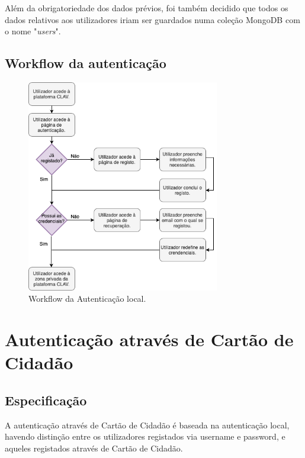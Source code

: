 Além da obrigatoriedade dos dados prévios, foi também decidido que todos os dados relativos aos utilizadores iriam ser guardados numa coleção MongoDB com o nome "\emph{users}".

\subsection{Workflow da autenticação}

\begin{figure}[h]
    \centering
    \includegraphics[width=0.75\textwidth]{img/diagramas/authlocal/AuthLocal.png}
    \caption{Workflow da Autenticação local.}
    \label{fig:flow_authlocal}
\end{figure}

\cleardoublepage
\section{Autenticação através de Cartão de Cidadão}
\subsection{Especificação}

A autenticação através de Cartão de Cidadão é baseada na autenticação local, havendo distinção entre os utilizadores registados via username e password, e aqueles registados através de Cartão de Cidadão.

